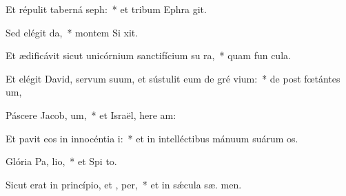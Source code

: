 \item Et répulit taberná seph:~* et tribum Ephra  git.
\item Sed elégit  da,~* montem Si  xit.
\item Et ædificávit sicut unicórnium sanctifícium su  ra,~* quam fun  cula.
\item Et elégit David, servum suum, et sústulit eum de gré vium:~* de post fœtántes  um,
\item Páscere Jacob,  um,~* et Israël, here am:
\item Et pavit eos in innocéntia  i:~* et in intelléctibus mánuum suárum  os.
\item Glória Pa,  lio,~* et Spi to.
\item Sicut erat in princípio, et ,  per,~* et in sǽcula sæ. men.
